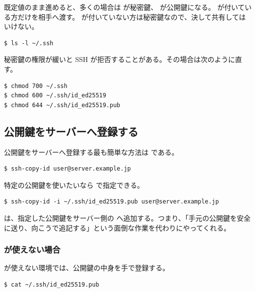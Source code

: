既定値のまま進めると、多くの場合は  が秘密鍵、 が公開鍵になる。 が付いている方だけを相手へ渡す。 が付いていない方は秘密鍵なので、決して共有してはいけない。

\begin{lstlisting}[numbers=none, xleftmargin=2\zw]
$ ls -l ~/.ssh
\end{lstlisting}

秘密鍵の権限が緩いと SSH が拒否することがある。その場合は次のように直す。

\begin{lstlisting}[numbers=none, xleftmargin=2\zw]
$ chmod 700 ~/.ssh
$ chmod 600 ~/.ssh/id_ed25519
$ chmod 644 ~/.ssh/id_ed25519.pub
\end{lstlisting}

\subsection{公開鍵をサーバーへ登録する}

公開鍵をサーバーへ登録する最も簡単な方法は  である。

\begin{lstlisting}[numbers=none, xleftmargin=2\zw]
$ ssh-copy-id user@server.example.jp
\end{lstlisting}

特定の公開鍵を使いたいなら  で指定できる。

\begin{lstlisting}[numbers=none, xleftmargin=2\zw]
$ ssh-copy-id -i ~/.ssh/id_ed25519.pub user@server.example.jp
\end{lstlisting}

 は、指定した公開鍵をサーバー側の  へ追加する。つまり、「手元の公開鍵を安全に送り、向こうで追記する」という面倒な作業を代わりにやってくれる。

\subsubsection{ が使えない場合}

 が使えない環境では、公開鍵の中身を手で登録する。

\begin{lstlisting}[numbers=none, xleftmargin=2\zw]
$ cat ~/.ssh/id_ed25519.pub
\end{lstlisting}

